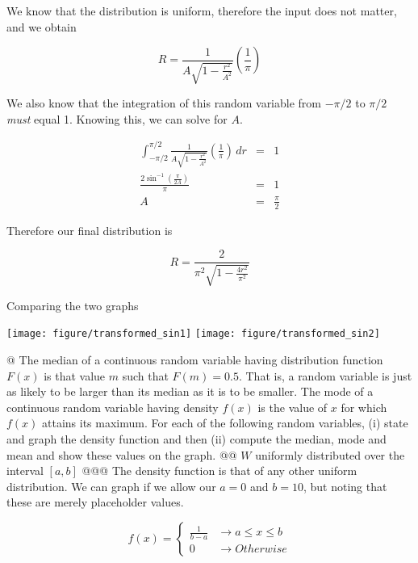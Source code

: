 \documentclass[10pt]{article}\usepackage[]{graphicx}\usepackage[]{xcolor}
\makeatletter
\def\maxwidth{ %
  \ifdim\Gin@nat@width>\linewidth
    \linewidth
  \else
    \Gin@nat@width
  \fi
}
\newenvironment{knitrout}{}{} %
\makeatother
\begin{document}
\begin{easylist}[enumerate]
    We know that the distribution is uniform, therefore the input does not matter, and we obtain

    \[
        R = \frac{1}{A \sqrt{1-\frac{r^2}{A^2} } } \left( \frac{1}{\pi} \right)
    \]

    We also know that the integration of this random variable from $-\pi/2$ to $\pi/2$ \textit{must} equal 1. Knowing
    this, we can solve for $A$.

    \[
        \begin{aligned}
            \int^{\pi/2}_{-\pi/2} \frac{1}{A \sqrt{1-\frac{r^2}{A^2} } } \left( \frac{1}{\pi} \right) \, dr &=& 1\\
            \frac{2 \sin^{-1} \left( \frac{\pi }{2 A} \right)}{\pi} &=& 1\\
            A &=& \frac{\pi}{2}
        \end{aligned}
    \]

    Therefore our final distribution is

    \[
        R = \frac{2}{\pi^2 \sqrt{1-\frac{4r^2}{\pi^2} } }
    \]

    Comparing the two graphs

\begin{knitrout}
\color{fgcolor}

{\centering \texttt{[image: figure/transformed\_sin1]} 
\texttt{[image: figure/transformed\_sin2]} 

}



\end{knitrout}


    @ The median of a continuous random variable having distribution function $F(x)$ is that value $m$ such that $F(m) =
    0.5$. That is, a random variable is just as likely to be larger than its median as it is to be smaller. The mode of
    a continuous random variable having density $f(x)$ is the value of $x$ for which $f(x)$ attains its maximum. For
    each of the following random variables, (i) state and graph the density function and then (ii) compute the median,
    mode and mean and show these values on the graph.
    @@ $W$ uniformly distributed over the interval $[a, b]$
    @@@ The density function is that of any other uniform distribution. We can graph if we allow our $a=0$ and $b=10$,
    but noting that these are merely placeholder values.

    \[
        f(x) =
        \begin{cases}
            \frac{1}{b - a} &\to a \le x \le b\\
            0 &\to Otherwise
        \end{cases}
    \]


\end{easylist}
\end{document}
